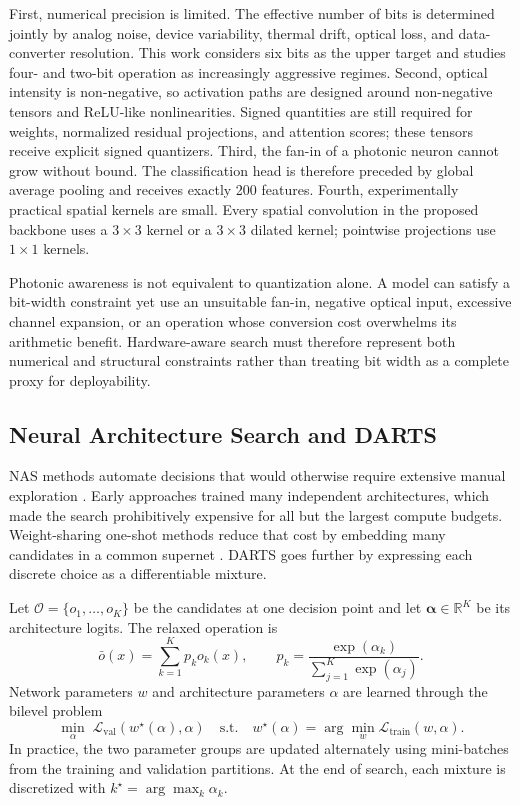 \documentclass[lettersize,journal]{IEEEtran}
\begin{document}
First, numerical precision is limited. The effective number of bits is determined jointly by analog noise, device variability, thermal drift, optical loss, and data-converter resolution. This work considers six bits as the upper target and studies four- and two-bit operation as increasingly aggressive regimes. Second, optical intensity is non-negative, so activation paths are designed around non-negative tensors and ReLU-like nonlinearities. Signed quantities are still required for weights, normalized residual projections, and attention scores; these tensors receive explicit signed quantizers. Third, the fan-in of a photonic neuron cannot grow without bound. The classification head is therefore preceded by global average pooling and receives exactly 200 features. Fourth, experimentally practical spatial kernels are small. Every spatial convolution in the proposed backbone uses a $3\times3$ kernel or a $3\times3$ dilated kernel; pointwise projections use $1\times1$ kernels.

Photonic awareness is not equivalent to quantization alone. A model can satisfy a bit-width constraint yet use an unsuitable fan-in, negative optical input, excessive channel expansion, or an operation whose conversion cost overwhelms its arithmetic benefit. Hardware-aware search must therefore represent both numerical and structural constraints rather than treating bit width as a complete proxy for deployability.

\subsection{Neural Architecture Search and DARTS}
NAS methods automate decisions that would otherwise require extensive manual exploration \cite{elsken2019nas}. Early approaches trained many independent architectures, which made the search prohibitively expensive for all but the largest compute budgets. Weight-sharing one-shot methods reduce that cost by embedding many candidates in a common supernet \cite{bender2018oneshot,guo2020singlepath}. DARTS goes further by expressing each discrete choice as a differentiable mixture.

Let $\mathcal{O}=\{o_1,\ldots,o_K\}$ be the candidates at one decision point and let $\boldsymbol{\alpha}\in\mathbb{R}^K$ be its architecture logits. The relaxed operation is
\begin{equation}
\bar{o}(x)=\sum_{k=1}^{K}p_k o_k(x), \qquad
p_k=\frac{\exp(\alpha_k)}{\sum_{j=1}^{K}\exp(\alpha_j)}.
\label{eq:mixedop}
\end{equation}
Network parameters $w$ and architecture parameters $\alpha$ are learned through the bilevel problem
\begin{equation}
\min_{\alpha}\;\mathcal{L}_{\mathrm{val}}(w^{\star}(\alpha),\alpha)
\quad\text{s.t.}\quad
w^{\star}(\alpha)=\arg\min_w\mathcal{L}_{\mathrm{train}}(w,\alpha).
\label{eq:bilevel}
\end{equation}
In practice, the two parameter groups are updated alternately using mini-batches from the training and validation partitions. At the end of search, each mixture is discretized with $k^{\star}=\arg\max_k\alpha_k$.
\end{document}
